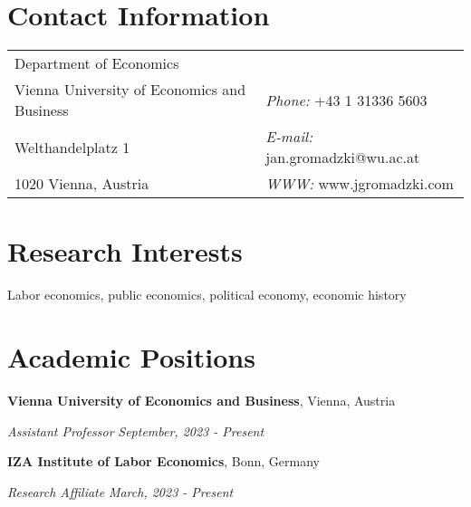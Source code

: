 \documentclass[margin,line]{res}
\begin{document}

\begin{resume}
\section{\sc Contact Information}
\vspace{.05in}
\begin{tabular}{@{}p{3.85in}p{4in}}            
Department of Economics   \\         
Vienna University of Economics and Business & {\it Phone:}  +43 1 31336 5603\\ 
Welthandelplatz 1 & {\it E-mail:}  jan.gromadzki@wu.ac.at\\       
1020 Vienna, Austria  & {\it WWW:} www.jgromadzki.com \\     
\end{tabular}


\section{\sc Research Interests}
Labor economics, public economics, political economy, economic history
\vspace*{.075in}

\section{\sc Academic Positions}
{\bf Vienna University of Economics and Business}, Vienna, Austria

\vspace{-.3cm}
{\em Assistant Professor} \hfill \textit{September, 2023 - Present}
\vspace*{.05in} 

{\bf IZA Institute of Labor Economics}, Bonn, Germany

\vspace{-.3cm}
{\em Research Affiliate} \hfill \textit{March, 2023 - Present}
\vspace*{.05in} 


\end{resume}
\end{document}
